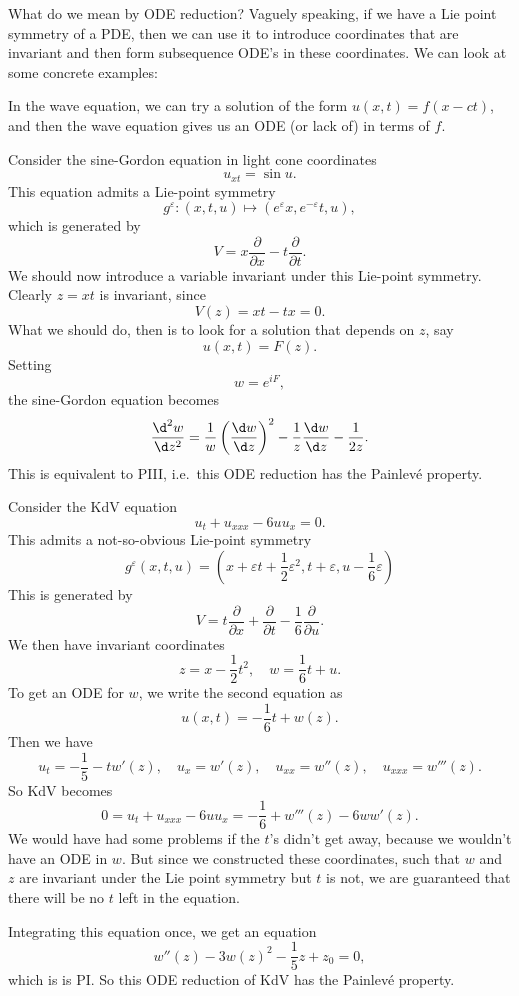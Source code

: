 \documentclass[a4paper]{article}
\begin{document}
What do we mean by ODE reduction? Vaguely speaking, if we have a Lie point symmetry of a PDE, then we can use it to introduce coordinates that are invariant and then form subsequence ODE's in these coordinates. We can look at some concrete examples:

\begin{eg}
  In the wave equation, we can try a solution of the form $u(x, t) = f(x - ct)$, and then the wave equation gives us an ODE (or lack of) in terms of $f$.
\end{eg}

\begin{eg}
  Consider the sine-Gordon equation in light cone coordinates
  \[
    u_{xt} = \sin u.
  \]
  This equation admits a Lie-point symmetry
  \[
    g^\varepsilon: (x, t, u) \mapsto (e^\varepsilon x, e^{-\varepsilon}t, u),
  \]
  which is generated by
  \[
    V = x \frac{\partial}{\partial x} - t \frac{\partial}{\partial t}.
  \]
  We should now introduce a variable invariant under this Lie-point symmetry. Clearly $z = xt$ is invariant, since
  \[
    V(z) = xt - tx = 0.
  \]
  What we should do, then is to look for a solution that depends on $z$, say
  \[
    u(x, t) = F(z).
  \]
  Setting
  \[
    w = e^{iF},
  \]
  the sine-Gordon equation becomes
  \[
    \frac{\d^2 w}{\d z^2} = \frac{1}{w} \left(\frac{\d w}{\d z}\right)^2 - \frac{1}{z} \frac{\d w}{\d z} - \frac{1}{2z}.
  \]
  This is equivalent to PIII, i.e.\ this ODE reduction has the Painlev\'e property.
\end{eg}

\begin{eg}
  Consider the KdV equation
  \[
    u_t + u_{xxx} - 6 uu_x = 0.
  \]
  This admits a not-so-obvious Lie-point symmetry
  \[
    g^\varepsilon (x, t, u) = \left(x + \varepsilon t + \frac{1}{2} \varepsilon^2, t + \varepsilon, u - \frac{1}{6} \varepsilon\right)
  \]
  This is generated by
  \[
    V = t \frac{\partial}{\partial x} + \frac{\partial}{\partial t} - \frac{1}{6} \frac{\partial}{\partial u}.
  \]
  We then have invariant coordinates
  \[
    z = x - \frac{1}{2}t^2,\quad w = \frac{1}{6} t + u.
  \]
  To get an ODE for $w$, we write the second equation as
  \[
    u(x, t) = - \frac{1}{6} t + w(z).
  \]
  Then we have
  \[
    u_t = - \frac{1}{5} - t w'(z),\quad u_x = w'(z),\quad u_{xx} = w''(z),\quad u_{xxx} = w'''(z).
  \]
  So KdV becomes
  \[
    0 = u_t + u_{xxx} - 6 uu_x = - \frac{1}{6} + w'''(z) - 6w w'(z).
  \]
  We would have had some problems if the $t$'s didn't get away, because we wouldn't have an ODE in $w$. But since we constructed these coordinates, such that $w$ and $z$ are invariant under the Lie point symmetry but $t$ is not, we are guaranteed that there will be no $t$ left in the equation.

  Integrating this equation once, we get an equation
  \[
    w''(z) - 3 w(z)^2 - \frac{1}{5}z + z_0 = 0,
  \]
  which is is PI. So this ODE reduction of KdV has the Painlev\'e property.
\end{eg}
\end{document}
